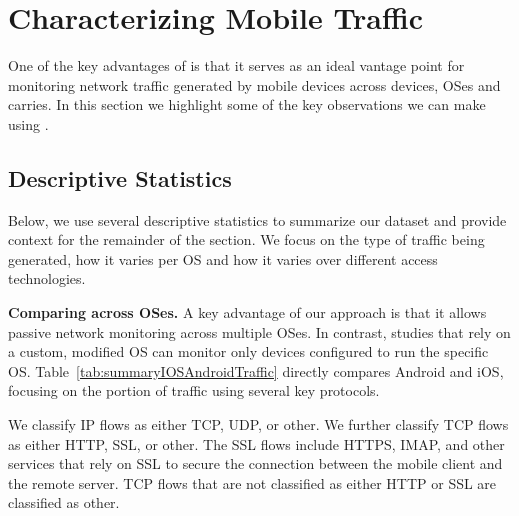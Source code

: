 \section{Characterizing Mobile Traffic}
\label{sec:measurement-results}

One of the key advantages of \meddle is that it serves as 
an ideal vantage point for monitoring network traffic 
generated by mobile devices across devices, OSes and 
carries. In this section we highlight some of the key observations 
we can make using \meddle.
%

\subsection{Descriptive Statistics}
\label{sec:initial-results}

Below, we use several descriptive statistics to 
summarize our dataset and provide context for the remainder 
of the section. We focus on the type of traffic being generated, 
how it varies per OS and how it varies over different access technologies.

\noindent\textbf{Comparing across OSes.}
A key advantage of our approach is that it allows passive network 
monitoring across multiple OSes. In contrast, studies that rely on a custom, modified 
OS can monitor only devices configured to run the specific OS.
Table~\ref{tab:summaryIOSAndroidTraffic} directly compares Android and iOS, 
focusing on the portion of traffic using several key protocols. 

We classify IP flows as either TCP, UDP, or other. We further classify TCP flows as either HTTP, SSL, or
other. The SSL flows include HTTPS, IMAP, and other services that rely
on SSL to secure the connection between the mobile client and the
remote server. TCP flows that are not classified
as either HTTP or SSL are classified as other.  


